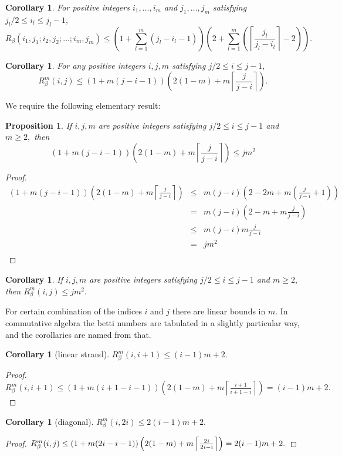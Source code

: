 \documentclass{article}
\theoremstyle{plain}
\newtheorem{cor}[thm]{Corollary}
\newtheorem{prop}[thm]{Proposition}
\theoremstyle{definition}
\begin{document}
\begin{cor}\label{cor:ramseybetti}
For positive integers $i_1,\ldots,i_m$ and $j_1,\ldots, j_m$ satisfying $j_l/2 \leq i_l \leq j_l-1,$ 
\[R_\beta(i_1,j_1;i_2,j_2;\ldots;i_m,j_m) \leq \left( 1+\sum_{l=1}^m (j_l-i_l-1) \right) \left(  2+\sum_{l=1}^m \left( \left\lceil \frac{j_l}{j_l-i_l} \right\rceil -2 \right)  \right). \]
\end{cor}

\begin{cor}\label{cor:multi} For any positive integers $i,j,m$ satisfying $j/2 \leq i \leq j-1,$ 
\[R_\beta^m(i,j) \leq \left( 1+ m (j-i-1) \right) \left(  2(1-m) + m  \left\lceil \frac{j}{j-i} \right\rceil  \right).
\]
\end{cor}

We require the following elementary result:
\begin{prop} If $i,j,m$ are positive integers satisfying $j/2 \leq i \leq j-1$ and $m\geq 2,$ then
\[ 
\left( 1+ m (j-i-1) \right) \left(  2(1-m) + m  \left\lceil \frac{j}{j-i} \right\rceil  \right)   \leq j m^2 \]
\end{prop}
\begin{proof}
\[ 
\begin{array}{rcl}
\left( 1+ m (j-i-1) \right) \left(  2(1-m) + m  \left\lceil \frac{j}{j-i} \right\rceil  \right) &\leq & m (j-i)   \left(  2 -2m + m \left(  \frac{j}{j-i} +1 \right)  \right) \\
& = & m (j-i)   \left(  2 -m  +m  \frac{j}{j-i}  \right) \\
& \leq & m (j-i)  m  \frac{j}{j-i}  \\
& = & jm^2   \\
\end{array}
\]
\end{proof}

\begin{cor}\label{cor:upper} If $i,j,m$ are positive integers satisfying $j/2 \leq i \leq j-1$ and $m\geq 2,$ then $ R_\beta^m(i,j) \leq jm^2. $
\end{cor}

For certain combination of the indices $i$ and $j$ there are linear bounds in $m.$ In commutative algebra the betti numbers are tabulated in a slightly particular way, and the corollaries are named from that.

\begin{cor}[linear strand] $R_\beta^m(i,i+1)  \leq (i-1)m+2.$
\end{cor}
\begin{proof}
$
R_\beta^m(i,i+1)  \leq  \left( 1+ m (i+1-i-1) \right) \left(  2(1-m) + m  \left\lceil \frac{i+1}{i+1-i} \right\rceil  \right) =  (i-1)m+2.
$
\end{proof}
\begin{cor}[diagonal] $R_\beta^m(i,2i)  \leq 2(i-1)m+2.$
\end{cor}
\begin{proof}
$
R_\beta^m(i,j)  \leq  \left( 1+ m (2i-i-1) \right) \left(  2(1-m) + m  \left\lceil \frac{2i}{2i-i} \right\rceil  \right) = 2(i-1)m+2. \\
$
\end{proof}
\end{document}
